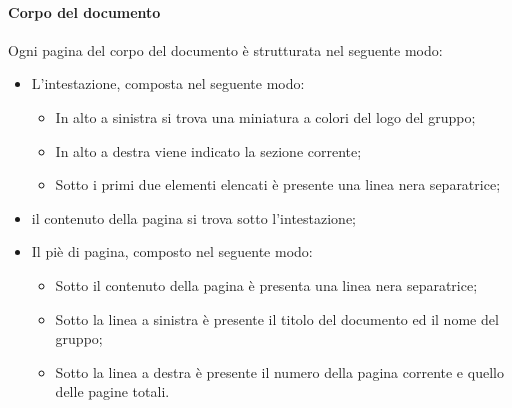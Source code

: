 \paragraph{Corpo del documento}       
Ogni pagina del corpo del documento è strutturata nel seguente modo:
\begin{itemize}
	\item L'intestazione, composta nel seguente modo:
	\begin{itemize}
		\item In alto a sinistra si trova una miniatura a colori del logo del gruppo;	
		\item In alto a destra viene indicato la sezione corrente;
		\item Sotto i primi due elementi elencati è presente una 	linea nera separatrice;
	\end{itemize}		
	\item il contenuto della pagina si trova sotto l'intestazione;	
	\item Il piè di pagina, composto nel seguente modo:	
	\begin{itemize}	
		\item Sotto il contenuto della pagina è presenta una linea nera separatrice;
		\item Sotto la linea a sinistra è presente il titolo del documento ed il nome del gruppo;
		\item Sotto la linea a destra è presente il numero della pagina corrente e quello delle pagine totali.		
	\end{itemize}
\end{itemize}
